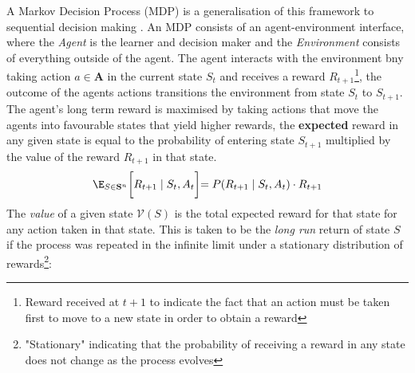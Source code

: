 \begin{center}
\end{center}
A Markov Decision Process (MDP) is a generalisation of this framework to sequential
decision making \cite{sutton2018reinforcement}. An MDP consists of an agent-environment
interface, where the \emph{Agent} is the learner and decision maker and the \emph{Environment}
consists of everything outside of the agent. The agent interacts with the environment
bny taking action $a \in \mathbf{A}$ in the current state $S_t$ and receives a reward $R_{t+1}$\footnote{Reward received at $t+1$ to indicate the fact that 
an action must be taken first to move to a new state in order to obtain a reward}, the outcome of the agents actions
transitions the environment from state $S_t$ to $S_{t+1}$.
The agent's long term reward is maximised by taking actions that move the agents into 
favourable states that yield higher rewards, the \textbf{expected} reward in any given state
is equal to the probability of entering state $S_{t+1}$ multiplied by the value of the reward $R_{t+1}$ in that state.
\begin{equation}
    {\displaystyle \E_{S \in \mathbf{S}^n}\biggl[R_{t+1} \; | \; S_t, A_t \biggl] = 
    P(R_{t+1}\; | \; S_t, A_t)\cdot R_{t+1}}
\end{equation}
The \emph{value} of a given state $\mathcal{V}(S)$ is the total expected reward for that state for any action taken in that state.
This is taken to be the \emph{long run} return of state $S$ if the process was repeated in the infinite limit under a stationary distribution of rewards\footnote{
    "Stationary" indicating that the probability of receiving a reward in any state does not change as the process evolves
}:
